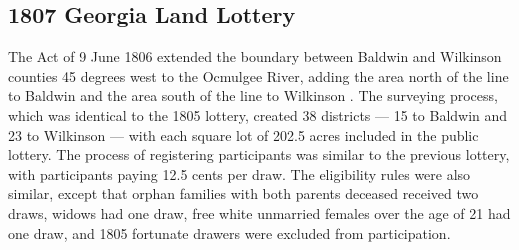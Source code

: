 \subsection{1807 Georgia Land Lottery}

The Act of 9 June 1806 extended the boundary between Baldwin and Wilkinson counties 45 degrees west to the Ocmulgee River, adding the area north of the line to Baldwin and the area south of the line to Wilkinson \citep{clayton1812}. The surveying process, which was identical to the 1805 lottery, created 38 districts --- 15 to Baldwin and 23 to Wilkinson --- with each square lot of 202.5 acres included in the public lottery. The process of registering participants was similar to the previous lottery, with participants paying 12.5 cents per draw. The eligibility rules were also similar, except that orphan families with both parents deceased received two draws, widows had one draw, free white unmarried females over the age of 21 had one draw, and 1805 fortunate drawers were excluded from participation. 

